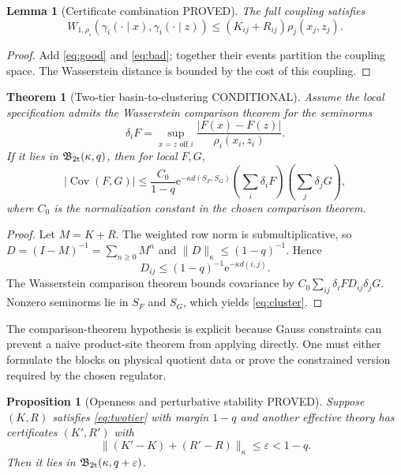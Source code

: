\documentclass[11pt]{article}
\newcommand{\Pstatus}{\textcolor{proved}{\textsf{PROVED}}}
\newcommand{\Cstatus}{\textcolor{conditional}{\textsf{CONDITIONAL}}}
\newcommand{\Cov}{\operatorname{Cov}}
\newcommand{\e}{\mathrm e}
\newtheorem{theorem}[definition]{Theorem}
\newtheorem{proposition}[definition]{Proposition}
\newtheorem{lemma}[definition]{Lemma}
\theoremstyle{remark}
\begin{document}
\begin{lemma}[Certificate combination \Pstatus]
The full coupling satisfies
\[
 W_{1,\rho_i}(\gamma_i(\cdot\mid x),\gamma_i(\cdot\mid z))
 \le (K_{ij}+R_{ij})\rho_j(x_j,z_j).
\]
\end{lemma}

\begin{proof}
Add \eqref{eq:good} and \eqref{eq:bad}; together their events partition the
coupling space.  The Wasserstein distance is bounded by the cost of this
coupling.
\end{proof}

\begin{theorem}[Two-tier basin-to-clustering \Cstatus]\label{thm:twotier}
Assume the local specification admits the Wasserstein comparison theorem for
the seminorms
\[
 \delta_iF=\sup_{x=z\text{ off }i}
 \frac{|F(x)-F(z)|}{\rho_i(x_i,z_i)}.
\]
If it lies in $\mathfrak B_{\rm 2t}(\kappa,q)$, then for local $F,G$,
\begin{equation}\label{eq:cluster}
 |\Cov(F,G)|
 \le \frac{C_0}{1-q}\e^{-\kappa d(S_F,S_G)}
 \left(\sum_i\delta_iF\right)
 \left(\sum_j\delta_jG\right),
\end{equation}
where $C_0$ is the normalization constant in the chosen comparison theorem.
\end{theorem}

\begin{proof}
Let $M=K+R$.  The weighted row norm is submultiplicative, so
$D=(I-M)^{-1}=\sum_{n\ge0}M^n$ and $\|D\|_\kappa\le(1-q)^{-1}$.  Hence
\[
 D_{ij}\le(1-q)^{-1}\e^{-\kappa d(i,j)}.
\]
The Wasserstein comparison theorem bounds covariance by
$C_0\sum_{ij}\delta_iF D_{ij}\delta_jG$.  Nonzero seminorms lie in
$S_F$ and $S_G$, which yields \eqref{eq:cluster}.
\end{proof}

The comparison-theorem hypothesis is explicit because Gauss constraints can
prevent a naive product-site theorem from applying directly.  One must either
formulate the blocks on physical quotient data or prove the constrained
version required by the chosen regulator.

\begin{proposition}[Openness and perturbative stability \Pstatus]
Suppose $(K,R)$ satisfies \eqref{eq:twotier} with margin $1-q$ and another
effective theory has certificates $(K',R')$ with
\[
 \|(K'-K)+(R'-R)\|_\kappa\le\varepsilon<1-q.
\]
Then it lies in $\mathfrak B_{\rm 2t}(\kappa,q+\varepsilon)$.
\end{proposition}
\end{document}
